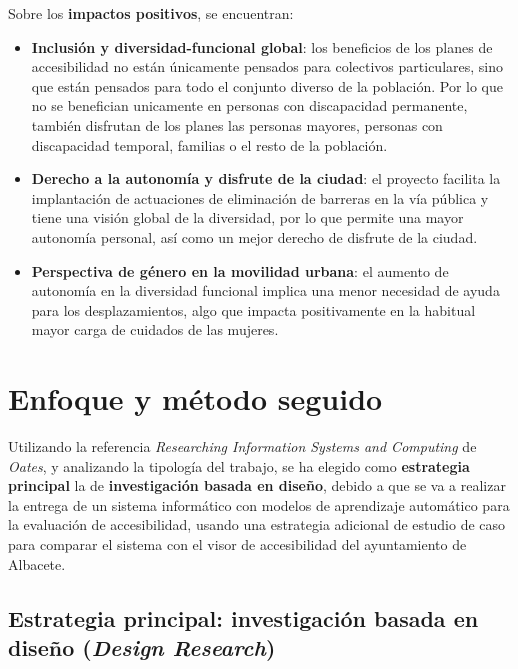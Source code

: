 Sobre los \textbf{impactos positivos}, se encuentran:
\begin{itemize}
    \item \textbf{Inclusión y \gls{diversidad-funcional} global}: los beneficios de los planes de accesibilidad no están únicamente pensados para colectivos particulares, sino que están pensados para todo el conjunto diverso de la población. Por lo que no se benefician unicamente en personas con discapacidad permanente, también disfrutan de los planes las personas mayores, personas con discapacidad temporal, familias o el resto de la población.
    \item \textbf{Derecho a la autonomía y disfrute de la ciudad}: el proyecto facilita la implantación de actuaciones de eliminación de barreras en la vía pública y tiene una visión global de la diversidad, por lo que permite una mayor autonomía personal, así como un mejor derecho de disfrute de la ciudad. 
    \item \textbf{Perspectiva de género en la movilidad urbana}: el aumento de autonomía en la diversidad funcional implica una menor necesidad de ayuda para los desplazamientos, algo que impacta positivamente en la habitual mayor carga de cuidados de las mujeres.
\end{itemize}

\section{Enfoque y método seguido}

Utilizando la referencia \textit{Researching Information Systems and Computing} de \textit{Oates}, y analizando la tipología del trabajo, se ha elegido como \textbf{estrategia principal} la de \textbf{investigación basada en diseño}, debido a que se va a realizar la entrega de un sistema informático con modelos de aprendizaje automático para la evaluación de accesibilidad, usando una estrategia adicional de estudio de caso para comparar el sistema con el visor de accesibilidad del ayuntamiento de Albacete.
\\

\subsection{Estrategia principal: investigación basada en diseño (\textit{Design Research})}

